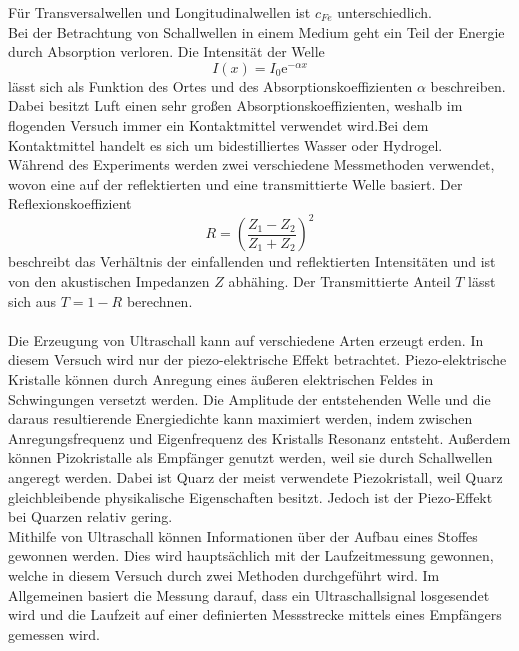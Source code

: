 Für Transversalwellen und Longitudinalwellen ist $c_{Fe}$ unterschiedlich.\\
Bei der Betrachtung von Schallwellen in einem Medium geht ein Teil der Energie durch Absorption verloren.
Die Intensität der Welle 
\begin{equation}
    I(x) = I_0 \text{e}^{-\alpha x}
    \label{eqn:Intensi}
\end{equation}
lässt sich als Funktion des Ortes und des Absorptionskoeffizienten $\alpha$ beschreiben. Dabei besitzt Luft einen sehr großen Absorptionskoeffizienten,
weshalb im flogenden Versuch immer ein Kontaktmittel verwendet wird.Bei dem Kontaktmittel handelt es sich um bidestilliertes Wasser oder Hydrogel.\\
Während des Experiments werden zwei verschiedene Messmethoden verwendet, wovon eine auf der reflektierten und eine transmittierte Welle basiert.
Der Reflexionskoeffizient 
\begin{equation}
    R = (\frac{Z_1-Z_2}{Z_1+Z_2})^2
\end{equation}
beschreibt das Verhältnis der einfallenden und reflektierten Intensitäten und ist von den akustischen Impedanzen $Z$ abhähing.
Der Transmittierte Anteil $T$ lässt sich aus $T = 1 - R$ berechnen.\\
\\
Die Erzeugung von Ultraschall kann auf verschiedene Arten erzeugt erden. In diesem Versuch wird nur der piezo-elektrische Effekt betrachtet.
Piezo-elektrische Kristalle können durch Anregung eines äußeren elektrischen Feldes in Schwingungen versetzt werden.
Die Amplitude der entstehenden Welle und die daraus resultierende Energiedichte kann maximiert werden, indem zwischen Anregungsfrequenz und Eigenfrequenz
des Kristalls Resonanz entsteht.
Außerdem können Pizokristalle als Empfänger genutzt werden, weil sie durch Schallwellen angeregt werden.
Dabei ist Quarz der meist verwendete Piezokristall, weil Quarz gleichbleibende physikalische Eigenschaften besitzt.
Jedoch ist der Piezo-Effekt bei Quarzen relativ gering.\\
Mithilfe von Ultraschall können Informationen über der Aufbau eines Stoffes gewonnen werden. Dies wird hauptsächlich mit der Laufzeitmessung gewonnen,
welche in diesem Versuch durch zwei Methoden durchgeführt wird. Im Allgemeinen basiert die Messung darauf, dass ein Ultraschallsignal 
losgesendet wird und die Laufzeit auf einer definierten Messstrecke mittels eines Empfängers gemessen wird.\\
